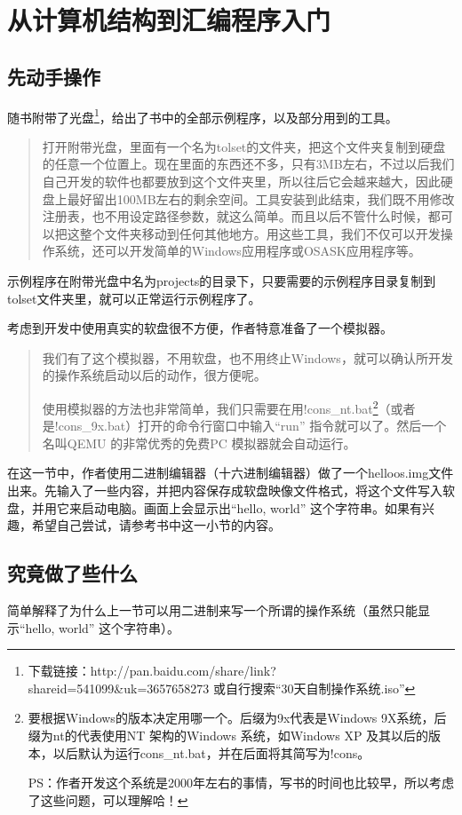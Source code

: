﻿\chapter{	从计算机结构到汇编程序入门	}
\section{	先动手操作	}
\label{start}
随书附带了光盘\footnote{下载链接：http://pan.baidu.com/share/link?shareid=541099\&uk=3657658273 或自行搜索“30天自制操作系统.iso”}，给出了书中的全部示例程序，以及部分用到的工具。
\begin{quote}
打开附带光盘，里面有一个名为tolset的文件夹，把这个文件夹复制到硬盘的任意一个位置上。现在里面的东西还不多，只有3MB左右，不过以后我们自己开发的软件也都要放到这个文件夹里，所以往后它会越来越大，因此硬盘上最好留出100MB左右的剩余空间。工具安装到此结束，我们既不用修改注册表，也不用设定路径参数，就这么简单。而且以后不管什么时候，都可以把这整个文件夹移动到任何其他地方。用这些工具，我们不仅可以开发操作系统，还可以开发简单的Windows应用程序或OSASK应用程序等。
\end{quote}

示例程序在附带光盘中名为projects的目录下，只要需要的示例程序目录复制到tolset文件夹里，就可以正常运行示例程序了。

考虑到开发中使用真实的软盘很不方便，作者特意准备了一个模拟器。

\begin{quote}
我们有了这个模拟器，不用软盘，也不用终止Windows，就可以确认所开发的操作系统启动以后的动作，很方便呢。

使用模拟器的方法也非常简单，我们只需要在用!cons\_nt.bat\footnote{要根据Windows的版本决定用哪一个。后缀为9x代表是Windows 9X系统，后缀为nt的代表使用NT 架构的Windows 系统，如Windows XP 及其以后的版本，以后默认为运行cons\_nt.bat，并在后面将其简写为!cons。\par
PS：作者开发这个系统是2000年左右的事情，写书的时间也比较早，所以考虑了这些问题，可以理解哈！}（或者是!cons\_9x.bat）打开的命令行窗口中输入“run” 指令就可以了。然后一个名叫QEMU 的非常优秀的免费PC 模拟器就会自动运行。
\end{quote}

\cs

在这一节中，作者使用二进制编辑器（十六进制编辑器）做了一个helloos.img文件出来。先输入了一些内容，并把内容保存成软盘映像文件格式，将这个文件写入软盘，并用它来启动电脑。画面上会显示出“hello, world” 这个字符串。如果有兴趣，希望自己尝试，请参考书中这一小节的内容。

\section{	究竟做了些什么	}
简单解释了为什么上一节可以用二进制来写一个所谓的操作系统（虽然只能显示“hello, world” 这个字符串）。
